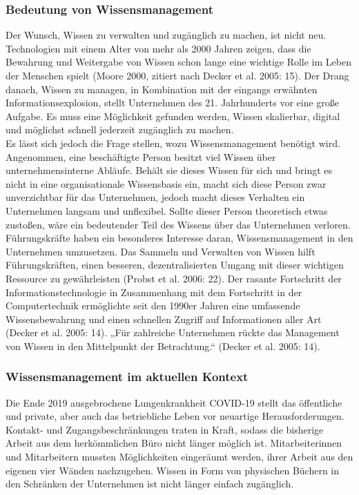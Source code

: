 \documentclass[a4paper]{scrartcl}
\begin{document}
\subsubsection{Bedeutung von Wissensmanagement}
Der Wunsch, Wissen zu verwalten und zugänglich zu machen, ist nicht neu. Technologien mit einem Alter von mehr als 2000 Jahren zeigen, dass die Bewahrung und Weitergabe von Wissen schon lange eine wichtige Rolle im Leben der Menschen spielt (Moore 2000, zitiert nach Decker et al. 2005: 15). Der Drang danach, Wissen zu managen, in Kombination mit der eingangs erwähnten Informationsexplosion, stellt Unternehmen des 21. Jahrhunderts vor eine große Aufgabe. Es muss eine Möglichkeit gefunden werden, Wissen skalierbar, digital und möglichst schnell jederzeit zugänglich zu machen. \\
Es lässt sich jedoch die Frage stellen, wozu Wissensmanagement benötigt wird. Angenommen, eine beschäftigte Person besitzt viel Wissen über unternehmensinterne Abläufe. Behält sie dieses Wissen für sich und bringt es nicht in eine organisationale Wissensbasis ein, macht sich diese Person zwar unverzichtbar für das Unternehmen, jedoch macht dieses Verhalten ein Unternehmen langsam und unflexibel. Sollte dieser Person theoretisch etwas zustoßen, wäre ein bedeutender Teil des Wissens über das Unternehmen verloren. \\
Führungskräfte haben ein besonderes Interesse daran, Wissensmanagement in den Unternehmen umzusetzen. Das Sammeln und Verwalten von Wissen hilft Führungskräften, einen besseren, dezentralisierten Umgang mit dieser wichtigen Ressource zu gewährleisten (Probst et al. 2006: 22). Der rasante Fortschritt der Informationstechnologie in Zusammenhang mit dem Fortschritt in der Computertechnik ermöglichte seit den 1990er Jahren eine umfassende Wissensbewahrung und einen schnellen Zugriff auf Informationen aller Art (Decker et al. 2005: 14). „Für zahlreiche Unternehmen rückte das Management von Wissen in den Mittelpunkt der Betrachtung.“ (Decker et al. 2005: 14).

\subsubsection{Wissensmanagement im aktuellen Kontext}
Die Ende 2019 ausgebrochene Lungenkrankheit COVID-19 stellt das öffentliche und private, aber auch das betriebliche Leben vor neuartige Herausforderungen. Kontakt- und Zugangsbeschränkungen traten in Kraft, sodass die bisherige Arbeit aus dem herkömmlichen Büro nicht länger möglich ist. Mitarbeiterinnen und Mitarbeitern mussten Möglichkeiten eingeräumt werden, ihrer Arbeit aus den eigenen vier Wänden nachzugehen. Wissen in Form von physischen Büchern in den Schränken der Unternehmen ist nicht länger einfach zugänglich.
\end{document}
